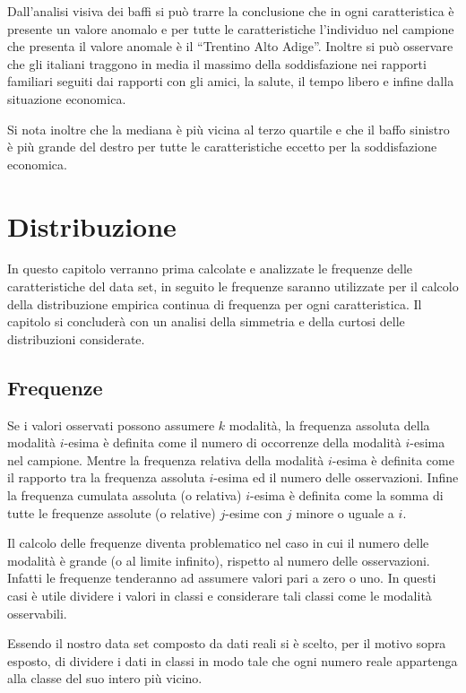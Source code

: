\documentclass[]{book}
\begin{document}
Dall'analisi visiva dei baffi si può trarre la conclusione che in ogni
caratteristica è presente un valore anomalo e per tutte le
caratteristiche l'individuo nel campione che presenta il valore anomale
è il ``Trentino Alto Adige''. Inoltre si può osservare che gli italiani
traggono in media il massimo della soddisfazione nei rapporti familiari
seguiti dai rapporti con gli amici, la salute, il tempo libero e infine
dalla situazione economica.

Si nota inoltre che la mediana è più vicina al terzo quartile e che il
baffo sinistro è più grande del destro per tutte le caratteristiche
eccetto per la soddisfazione economica.

\chapter{Distribuzione}\label{distribuzione}

In questo capitolo verranno prima calcolate e analizzate le frequenze
delle caratteristiche del data set, in seguito le frequenze saranno
utilizzate per il calcolo della distribuzione empirica continua di
frequenza per ogni caratteristica. Il capitolo si concluderà con un
analisi della simmetria e della curtosi delle distribuzioni considerate.

\section{Frequenze}\label{frequenze}

Se i valori osservati possono assumere \(k\) modalità, la frequenza
assoluta della modalità \(i\)-esima è definita come il numero di
occorrenze della modalità \(i\)-esima nel campione. Mentre la frequenza
relativa della modalità \(i\)-esima è definita come il rapporto tra la
frequenza assoluta \(i\)-esima ed il numero delle osservazioni. Infine
la frequenza cumulata assoluta (o relativa) \(i\)-esima è definita come
la somma di tutte le frequenze assolute (o relative) \(j\)-esime con
\(j\) minore o uguale a \(i\).

Il calcolo delle frequenze diventa problematico nel caso in cui il
numero delle modalità è grande (o al limite infinito), rispetto al
numero delle osservazioni. Infatti le frequenze tenderanno ad assumere
valori pari a zero o uno. In questi casi è utile dividere i valori in
classi e considerare tali classi come le modalità osservabili.

Essendo il nostro data set composto da dati reali si è scelto, per il
motivo sopra esposto, di dividere i dati in classi in modo tale che ogni
numero reale appartenga alla classe del suo intero più vicino.
\end{document}
